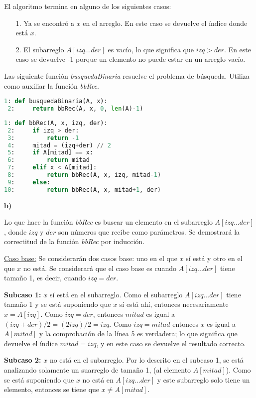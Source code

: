 \documentclass{article}
\begin{document}
El algoritmo termina en alguno de los siguientes casos:
\begin{itemize}
\item[1.] Ya se encontró a $x$ en el arreglo. En este caso se devuelve el índice donde está $x$.
\item[2.] El subarreglo $A[izq...der]$ es vacío, lo que significa que $izq > der$. En este caso se devuelve -1 porque un elemento no puede estar en un arreglo vacío.
\end{itemize}

Las siguiente función \textit{busquedaBinaria} resuelve el problema de búsqueda. Utiliza como auxiliar la función \textit{bbRec}.

\begin{lstlisting}[language=Python]
 1: def busquedaBinaria(A, x):
 2:     return bbRec(A, x, 0, len(A)-1)
\end{lstlisting}

\begin{lstlisting}[language=Python]
 1: def bbRec(A, x, izq, der):
 2:     if izq > der:
 3:         return -1
 4:     mitad = (izq+der) // 2
 5:     if A[mitad] == x:
 6:         return mitad
 7:     elif x < A[mitad]:
 8:         return bbRec(A, x, izq, mitad-1)
 9:     else:
10:         return bbRec(A, x, mitad+1, der)
\end{lstlisting}

\textbf{b)}

Lo que hace la función \textit{bbRec} es buscar un elemento en el subarreglo $A[izq...der]$, donde $izq$ y $der$ son números que recibe como parámetros. Se demostrará la correctitud de la función \textit{bbRec} por inducción.

\underline{Caso base:} Se considerarán dos casos base: uno en el que $x$ sí está y otro en el que $x$ no está. Se considerará que el caso base es cuando $A[izq...der]$ tiene tamaño 1, es decir, cuando $izq = der$.

\textbf{Subcaso 1:} $x$ sí está en el subarreglo. Como el subarreglo $A[izq...der]$ tiene tamaño 1 y se está suponiendo que $x$ sí está ahí, entonces necesariamente $x = A[izq]$. Como $izq = der$, entonces $mitad$ es igual a $(izq+der)/2=(2izq)/2 = izq$. Como $izq = mitad$ entonces $x$ es igual a $A[mitad]$ y la comprobación de la línea 5 es verdadera; lo que significa que devuelve el índice $mitad = izq$, y en este caso se devuelve el resultado correcto.

\textbf{Subcaso 2:} $x$ no está en el subarreglo. Por lo descrito en el subcaso 1, se está analizando solamente un suarreglo de tamaño 1, (al elemento $A[mitad]$). Como se está suponiendo que $x$ no está en $A[izq...der]$ y este subarreglo solo tiene un elemento, entonces se tiene que $x \neq A[mitad]$.
\end{document}
